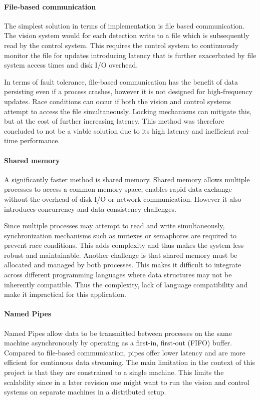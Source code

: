 \paragraph*{File-based communication}
The simplest solution in terms of implementation is file based communication. The vision system would for each detection write to a file which is subsequently read by the control system. This requires the control system to continuously monitor the file for updates introducing latency that is further exacerbated by file system access times and disk I/O overhead. 

In terms of fault tolerance, file-based communication has the benefit of data persisting even if a process crashes, however it is not designed for high-frequency updates. Race conditions can occur if both the vision and control systems attempt to access the file simultaneously. Locking mechanisms can mitigate this, but at the cost of further increasing latency. This method was therefore concluded to not be a viable solution due to its high latency and inefficient real-time performance.

\paragraph*{Shared memory}
A significantly faster method is shared memory. Shared memory allows multiple processes to access a common memory space, enables rapid data exchange without the overhead of disk I/O or network communication. However it also introduces concurrency and data consistency challenges. 

Since multiple processes may attempt to read and write simultaneously, synchronization mechanisms such as mutexes or semaphores are required to prevent race conditions. This adds complexity and thus makes the system less robust and maintainable. Another challenge is that shared memory must be allocated and managed by both processes. This makes it difficult to integrate across different programming languages where data structures may not be inherently compatible. Thus the complexity, lack of language compatibility and make it impractical for this application.

\paragraph*{Named Pipes}
Named Pipes allow data to be transmitted between processes on the same machine asynchronously by operating as a first-in, first-out (FIFO) buffer. Compared to file-based communication, pipes offer lower latency and are more efficient for continuous data streaming. The main limitation in the context of this project is that they are constrained to a single machine. This limits the scalability since in a later revision one might want to run the vision and control systems on separate machines in a distributed setup. 

